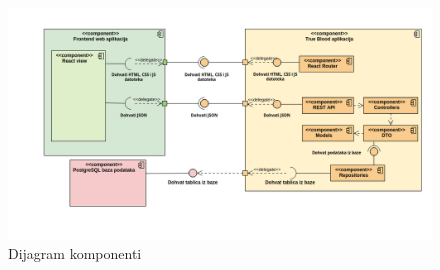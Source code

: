 \begin{figure}[H]
	\centering
	\includegraphics[width=\textwidth, scale=0.5]{dijagrami/dijagram_komponenti}
	\caption{Dijagram komponenti}
	\label{fig:dijagram_komponenti}
\end{figure}